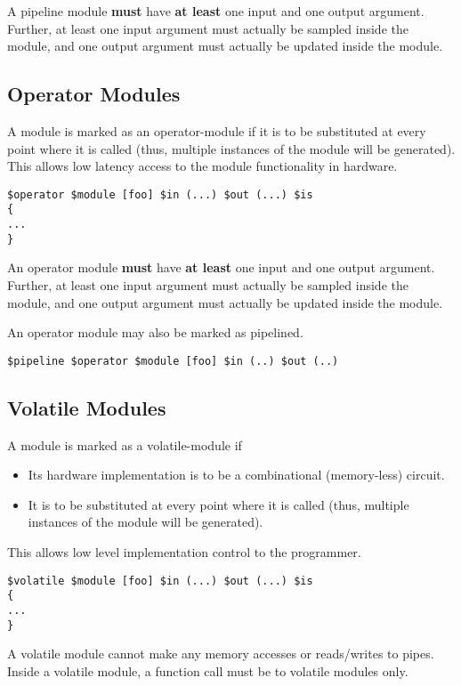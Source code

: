 \documentclass{article}
\begin{document}
A pipeline module {\bf must} have {\bf at least} one input
and one output argument.  Further, at least one input argument
must actually be sampled inside the module, and one output argument
must actually be updated inside the module.


\subsection{Operator Modules}

A module is marked as an operator-module if it
is to be substituted at every point where it
is called (thus, multiple instances of the module
will be generated).
This allows low latency access to the module
functionality in hardware.

\begin{verbatim}
$operator $module [foo] $in (...) $out (...) $is
{
...
}
\end{verbatim}

An operator module {\bf must} have {\bf at least} one input
and one output argument.  Further, at least one input argument
must actually be sampled inside the module, and one output argument
must actually be updated inside the module.

An operator module may also be marked as pipelined.
\begin{verbatim}
$pipeline $operator $module [foo] $in (..) $out (..)
\end{verbatim}

\subsection{Volatile Modules}

A module is marked as a volatile-module if 
\begin{itemize}
\item Its hardware implementation is to be 
a combinational (memory-less) circuit.
\item It is to be substituted at every point where it
is called (thus, multiple instances of the module
will be generated).
\end{itemize}
This allows low level implementation control
to the programmer.

\begin{verbatim}
$volatile $module [foo] $in (...) $out (...) $is
{
...
}
\end{verbatim}

A volatile module cannot make any memory accesses or 
reads/writes to pipes.  Inside a volatile module, 
a function call must be to volatile modules only.
\end{document}
